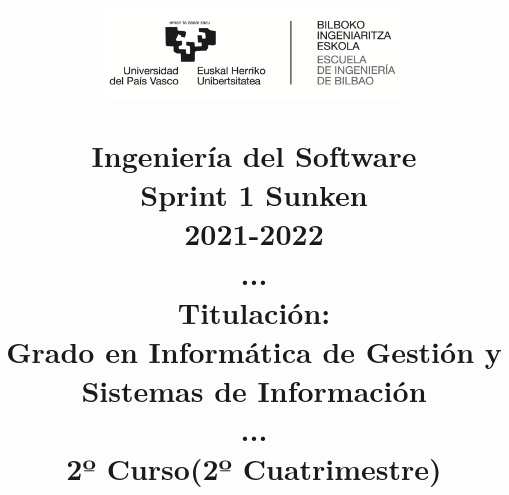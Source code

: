 \usepackage{graphicx} %
\usepackage{float}%
\graphicspath{ {images/} }

\title{%
    \begin{figure}[H]
        \centering
        \includegraphics[width=0.7\textwidth]{Logo_EHU.png}
    \end{figure}
  \textbf{Ingeniería del Software} \\
  \large{Sprint 1 Sunken \\
            2021-2022\\
            ...\\
            \textbf{Titulación:}\\
            Grado en Informática de Gestión y Sistemas de Información\\
            ...\\
            2º Curso(2º Cuatrimestre)
    }
}
